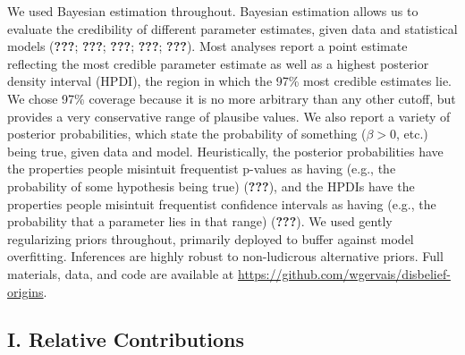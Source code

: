 \documentclass[english,man,mask]{article}
\begin{document}
We used Bayesian estimation throughout. Bayesian estimation allows us to evaluate the credibility of different parameter estimates, given data and statistical models ({\textbf{???}}; {\textbf{???}}; {\textbf{???}}; {\textbf{???}}; {\textbf{???}}). Most analyses report a point estimate reflecting the most credible parameter estimate as well as a highest posterior density interval (HPDI), the region in which the 97\% most credible estimates lie. We chose 97\% coverage because it is no more arbitrary than any other cutoff, but provides a very conservative range of plausibe values. We also report a variety of posterior probabilities, which state the probability of something (\(\beta > 0\), etc.) being true, given data and model. Heuristically, the posterior probabilities have the properties people misintuit frequentist p-values as having (e.g., the probability of some hypothesis being true) ({\textbf{???}}), and the HPDIs have the properties people misintuit frequentist confidence intervals as having (e.g., the probability that a parameter lies in that range) ({\textbf{???}}). We used gently regularizing priors throughout, primarily deployed to buffer against model overfitting. Inferences are highly robust to non-ludicrous alternative priors. Full materials, data, and code are available at \url{https://github.com/wgervais/disbelief-origins}.

\hypertarget{i.-relative-contributions}{%
\subsection{I. Relative Contributions}\label{i.-relative-contributions}}
\end{document}
